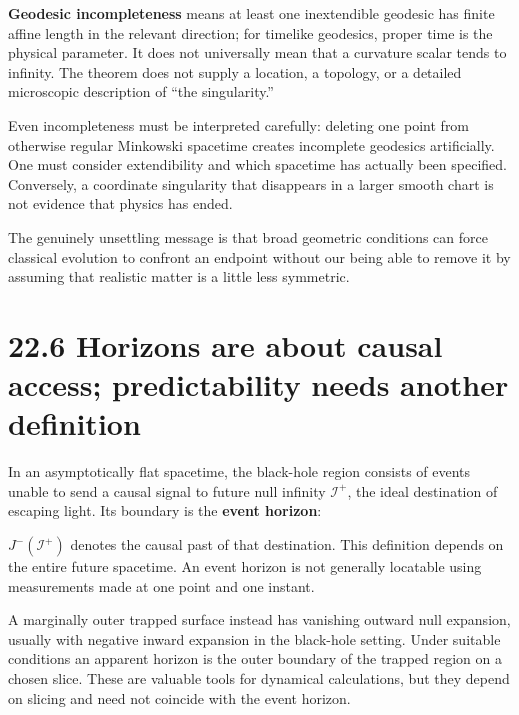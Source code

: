 \documentclass[
  11pt,
  letterpaper,
  oneside,
  openany]{scrbook}
\begin{document}
\textbf{Geodesic incompleteness} means at least one inextendible
geodesic has finite affine length in the relevant direction; for
timelike geodesics, proper time is the physical parameter. It does not
universally mean that a curvature scalar tends to infinity. The theorem
does not supply a location, a topology, or a detailed microscopic
description of ``the singularity.''

Even incompleteness must be interpreted carefully: deleting one point
from otherwise regular Minkowski spacetime creates incomplete geodesics
artificially. One must consider extendibility and which spacetime has
actually been specified. Conversely, a coordinate singularity that
disappears in a larger smooth chart is not evidence that physics has
ended.

The genuinely unsettling message is that broad geometric conditions can
force classical evolution to confront an endpoint without our being able
to remove it by assuming that realistic matter is a little less
symmetric.

\hypertarget{horizons-are-about-causal-access-predictability-needs-another-definition}{%
\section{22.6 Horizons are about causal access; predictability needs
another
definition}\label{horizons-are-about-causal-access-predictability-needs-another-definition}}

In an asymptotically flat spacetime, the black-hole region consists of
events unable to send a causal signal to future null infinity
\(\mathscr I^+\), the ideal destination of escaping light. Its boundary
is the \textbf{event horizon}:

\begin{center}
\begingroup
{}
\ifdim\wd\grmathbox>\linewidth
\resizebox{\linewidth}{!}{\usebox{\grmathbox}}
\else\usebox{\grmathbox}\fi
\endgroup
\end{center}

\(J^-(\mathscr I^+)\) denotes the causal past of that destination. This
definition depends on the entire future spacetime. An event horizon is
not generally locatable using measurements made at one point and one
instant.

A marginally outer trapped surface instead has vanishing outward null
expansion, usually with negative inward expansion in the black-hole
setting. Under suitable conditions an apparent horizon is the outer
boundary of the trapped region on a chosen slice. These are valuable
tools for dynamical calculations, but they depend on slicing and need
not coincide with the event horizon.
\end{document}
